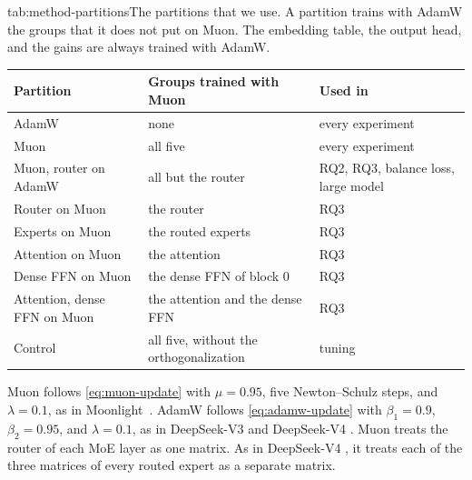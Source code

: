 \begin{table}[The partitions]{tab:method-partitions}{The partitions that we use. A partition trains with AdamW the groups that it does not put on Muon. The embedding table, the output head, and the gains are always trained with AdamW.}
  \small
  \begin{tabular}{lll}
    \toprule
    Partition                     & Groups trained with Muon                    & Used in                                     \\
    \midrule
    AdamW                         & none                                        & every experiment                            \\
    Muon                          & all five                                    & every experiment                            \\
    Muon, router on AdamW         & all but the router                          & RQ2, RQ3, balance loss, large model         \\
    Router on Muon                & the router                                  & RQ3                                         \\
    Experts on Muon               & the routed experts                          & RQ3                                         \\
    Attention on Muon             & the attention                               & RQ3                                         \\
    Dense FFN on Muon             & the dense FFN of block 0                    & RQ3                                         \\
    Attention, dense FFN on Muon  & the attention and the dense FFN             & RQ3                                         \\
    Control                       & all five, without the orthogonalization & tuning                                      \\
    \bottomrule
  \end{tabular}
\end{table}

Muon follows \cref{eq:muon-update} with $\mu = 0.95$, five Newton--Schulz steps, and $\lambda = 0.1$, as in Moonlight~\cite{liu2025moonlight}. AdamW follows \cref{eq:adamw-update} with $\beta_1 = 0.9$, $\beta_2 = 0.95$, and $\lambda = 0.1$, as in DeepSeek-V3 and DeepSeek-V4 \cite{deepseek2024v3, deepseek2026v4}. Muon treats the router of each MoE layer as one matrix. As in DeepSeek-V4 \cite{deepseek2026v4}, it treats each of the three matrices of every routed expert as a separate matrix.

